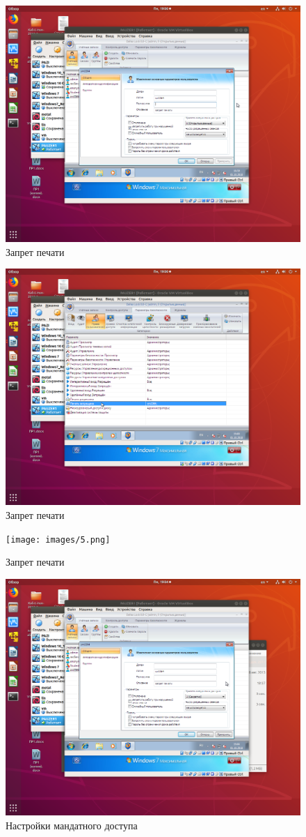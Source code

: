 \begin{figure}[H]
	\centering
	\includegraphics[width=.8\textwidth]{images/3.png}
	\caption{Запрет печати}	
\end{figure}

\begin{figure}[H]
	\centering
	\includegraphics[width=.8\textwidth]{images/4.png}
	\caption{Запрет печати}	
\end{figure}

\begin{figure}[H]
	\centering
	\texttt{[image: images/5.png]}
	\caption{Запрет печати}
\end{figure}

\begin{figure}[H]
	\centering
	\includegraphics[width=.8\textwidth]{images/6.png}
	\caption{Настройки мандатного доступа}
\end{figure}


